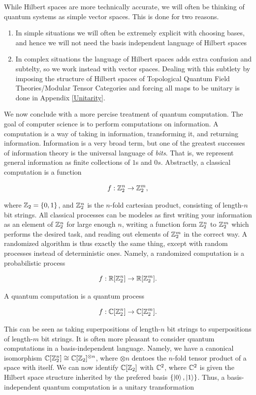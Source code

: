 \documentclass{article}
\theoremstyle{definition}
\numberwithin{figure}{section}
\begin{document}
While Hilbert spaces are more technically accurate, we will often be thinking of quantum systems as simple vector spaces. This is done for two reasons.

\begin{enumerate}
\item In simple situations we will often be extremely explicit with choosing bases, and hence we will not need the basis independent language of Hilbert spaces

\item In complex situations the language of Hilbert spaces adds extra confusion and subtelty, so we work instead with vector spaces. Dealing with this subtlety by imposing the structure of Hilbert spaces of Topological Quantum Field Theories/Modular Tensor Categories and forcing all maps to be unitary is done in Appendix \ref{Unitarity}.
\end{enumerate}

We now conclude with a more percise treatment of quantum computation. The goal of computer science is to perform computations on information. A computation is a way of taking in information, transforming it, and returning information. Information is a very broad term, but one of the greatest successes of information theory is the universal language of \textit{bits}. That is, we represent general information as finite collections of $1$s and $0s$. Abstractly, a classical computation is a function

$$f:\mathbb{Z}_2^{n}\to \mathbb{Z}_2^m,$$

where $\mathbb{Z}_2=\{0,1\}$, and $\mathbb{Z}_2^n$ is the $n$-fold cartesian product, consisting of length-$n$ bit strings. All classical processes can be modeles as first writing your information as an element of $\mathbb{Z}_2^n$ for large enough $n$, writing a function form $\mathbb{Z}_2^n$ to $\mathbb{Z}_2^m$ which performs the desired task, and reading out elements of $\mathbb{Z}_2^m$ in the correct way. A randomized algorithm is thus exactly the same thing, except with random processes instead of deterministic ones. Namely, a randomized computation is a probabilistic process

$$f:\mathbb{R}[\mathbb{Z}_2^n]\to \mathbb{R}[\mathbb{Z}_2^m].$$

A quantum computation is a quantum process

$$f:\mathbb{C}[\mathbb{Z}_2^n]\to \mathbb{C}[\mathbb{Z}_2^m].$$

This can be seen as taking superpositions of length-$n$ bit strings to superpositions of length-$m$ bit strings. It is often more pleasant to consider quantum computations in a basis-independent language. Namely, we have a canonical isomorphism $\mathbb{C}[\mathbb{Z}_2^n]\cong \mathbb{C}[\mathbb{Z}_2]^{\otimes n}$, where $\otimes n$ dentoes the $n$-fold tensor product of a space with itself. We can now identify $\mathbb{C}[\mathbb{Z}_2]$ with $\mathbb{C}^2$, where $\mathbb{C}^2$ is given the Hilbert space structure inherited by the prefered basis $\{\left|0\right>,\left|1\right>\}$. Thus, a basis-independent quantum computation is a unitary transformation
\end{document}
